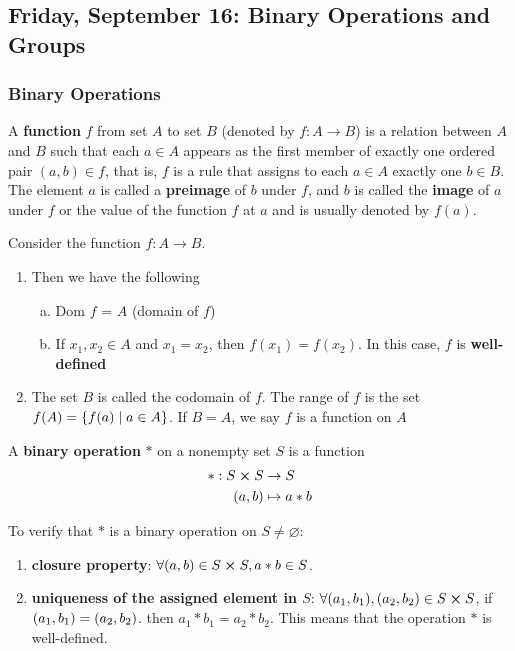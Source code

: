 \subsection{Friday, September 16: Binary Operations and Groups}
\subsubsection{Binary Operations}

\begin{definition}[Function]
    A \textbf{function} $f$ from set $A$ to set $B$ (denoted by $f : A \to B$) is a relation between $A$ and $B$ such that each $a \in A$ appears as the first member of exactly one ordered pair $(a, b) \in f$, that is, $f$ is a rule that assigns to each $a \in A$ exactly one $b \in B$. The element $a$ is called a \textbf{preimage} of $b$ under $f$, and $b$ is called the \textbf{image} of $a$ under $f$ or the value of the function $f$ at $a$ and is usually denoted by $f(a)$.
\end{definition}

\begin{remark}
    Consider the function $f : A \to B$.
    \begin{enumerate}
        \item Then we have the following
        \begin{enumerate}[(a)]
            \item Dom $f$ = $A$ (domain of $f$)
            \item If $x_1, x_2 \in A$ and $x_1 = x_2$, then $f(x_1) = f(x_2)$. In this case, $f$ is \textbf{well-defined}
        \end{enumerate}
        \item The set $B$ is called the codomain of $f$. The range of $f$ is the set $f(A) = \qty{f(a) \mid a \in A}$. If $B = A$, we say $f$ is a function on $A$
    \end{enumerate}
\end{remark}


\begin{definition}
    A \textbf{binary operation} $\ast$ on a nonempty set $S$ is a function
    \begin{align*}
        \ast : S \cross S &\to S \\
        \qty(a, b) &\mapsto a \ast b
    \end{align*}
\end{definition}

\begin{remark}
    To verify that $\ast$ is a binary operation on $S \neq \varnothing$:
    \begin{enumerate}
        \item \textbf{closure property}: $\forall \qty(a, b) \in S \cross S, a \ast b \in S$.
        \item \textbf{uniqueness of the assigned element in $S$}: $\forall \qty(a_1, b_1), \qty(a_2, b_2) \in S \cross S$, if $\qty(a_1, b_1) = \qty(a_2, b_2)$. then $a_1 \ast b_1 = a_2 \ast b_2$. This means that the operation $\ast$ is well-defined.
    \end{enumerate}
\end{remark}


